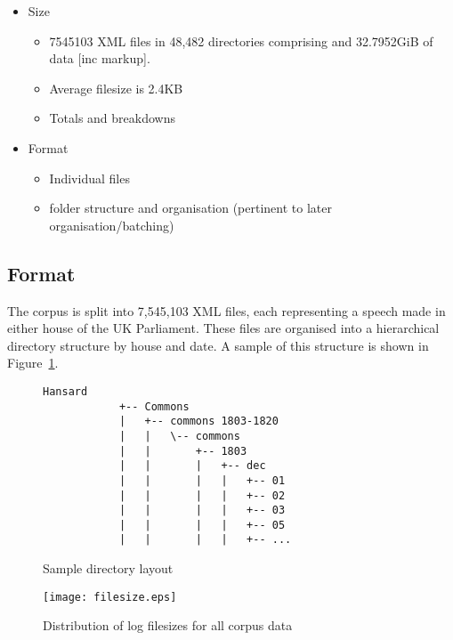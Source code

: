 
\begin{itemize}
    \item Size
        \begin{itemize}
            \item 7545103 XML files in 48,482 directories comprising  and 32.7952GiB of data [inc markup].
            \item Average filesize is 2.4KB
            \item Totals and breakdowns
        \end{itemize}
    \item Format
        \begin{itemize}
            \item Individual files
            \item folder structure and organisation (pertinent to later organisation/batching)
        \end{itemize}
\end{itemize}

\subsection{Format}
The corpus is split into 7,545,103 XML files, each representing a speech made in either house of the UK Parliament.  These files are organised into a hierarchical directory structure by house and date.  A sample of this structure is shown in Figure~\ref{fig:structure}.

\begin{figure}[h]
    \centering
    {
        \small
        \begin{Verbatim}[frame=single]
            Hansard
            +-- Commons
            |   +-- commons 1803-1820
            |   |   \-- commons
            |   |       +-- 1803
            |   |       |   +-- dec
            |   |       |   |   +-- 01
            |   |       |   |   +-- 02
            |   |       |   |   +-- 03
            |   |       |   |   +-- 05
            |   |       |   |   +-- ...
        \end{Verbatim} 
    }
    \caption{Sample directory layout}
    \label{fig:structure}
\end{figure}


\begin{figure}[h]
    \centering
    \texttt{[image: filesize.eps]}
    \caption{Distribution of log filesizes for all corpus data}
    \label{fig:filesizes}
\end{figure}


